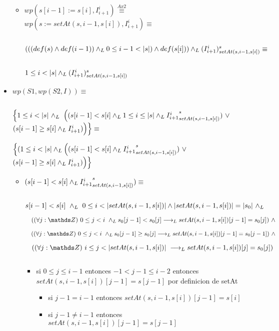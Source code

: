 \documentclass{article}
\begin{document}
\begin{itemize}
\begin{itemize}
        \item $wp(s[i-1]:=s[i], I_{i+1}^{i}) \stackrel{Ax2}{\equiv} $
        $ wp(s:=setAt(s,i-1, s[i]), I_{i+1}^{i}) \equiv $

        $ $

        $ (((def(s) \wedge def(i-1)) \land _L 0 \leq i-1 < |s|) \wedge def(s[i])) \land _L (I_{i+1}^{i})_{setAt(s,i-1, s[i])}^{s} \equiv $

        $ $

        $ 1 \leq i < |s| \land _L (I_{i+1}^{i})_{setAt(s,i-1, s[i])}^{s}$

    \end{itemize}

    \item $wp(S1, wp(S2, I)) \equiv$

    $ $

    $ \Big\{ 1 \leq i < \longitud{s}\ \yLuego $ 
    $ \Big( (s[i-1] < s[i] \land _L 1 \leq i \leq |s| \land _L {I_{i+1}^{i}}_{setAt(s,i-1, s[i])}^{s})\ \vee $
    $ (s[i-1] \geq s[i] \land _L I_{i+1}^{i}) \Big) \Big\} \equiv $
 
    $ \Big\{ (1 \leq i < \longitud{s} \yLuego \Big((s[i-1] < s[i] \yLuego {I_{i+1}^{i}}_{setAt(s,i-1, s[i])}^{s})\ \vee $
    $ (s[i-1] \geq s[i] \land _L I_{i+1}^{i}) \Big) \Big\} $

    \begin{itemize}
        
        \item $(s[i-1] < s[i] \land _L {I_{i+1}^{i}}_{setAt(s,i-1, s[i])}^{s}) \equiv$

        $ $

        $ s[i-1] < s[i]\ \land _L\ 0 \leq i < |setAt(s,i-1, s[i])| \wedge |setAt(s,i-1, s[i])| = |s_0|\ \land _L $

        $ \quad (\paraTodo{j}{0}{i} \yLuego s_0[j-1] < s_0[j] \implicaLuego setAt(s,i-1, s[i])[j-1] = s_0[j])\ \wedge $

        $ \quad (\paraTodo{j}{0}{i} \yLuego s_0[j-1] \geq s_0[j] \implicaLuego setAt(s,i-1, s[i])[j-1] = s_0[j-1])\ \wedge $

        $ \quad (\paraTodo{j}{i}{\longitud{setAt(s,i-1, s[i])}} \implicaLuego setAt(s,i-1, s[i])[j] = s_0[j])\ $

        $ $

        \begin{itemize}
            \item si $0 \leq j \leq i -1$ entonces $-1 < j - 1 \leq i - 2$ entonces $setAt(s,i-1, s[i])[j-1] = s[j-1]$ por definicion de setAt
                \begin{itemize}
                    \item si $j-1 = i-1$ entonces $setAt(s,i-1, s[i])[j-1] = s[i]$
                    \item si $j-1 \neq i-1$ entonces $setAt(s,i-1, s[i])[j-1] = s[j-1]$
                \end{itemize}
        \end{itemize}


\end{itemize}
\end{itemize}
\end{document}
